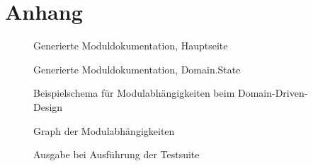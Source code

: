 \section{Anhang} \label{Anhang}

\begin{figure}[ht]
    \caption{Generierte Moduldokumentation, Hauptseite}
    \label{module-doc-index}
\end{figure}

\begin{figure}[ht]
    \caption{Generierte Moduldokumentation, Domain.State}
    \label{module-doc-state}
\end{figure}

\begin{figure}[ht]
    \caption{Beispielschema für Modulabhängigkeiten beim Domain-Driven-Design \cite{domain-driven-design}}
    \label{domain-driven-design-layers}
    \centering{}
\end{figure}

\begin{figure}[ht]
    \caption{Graph der Modulabhängigkeiten}
    \label{module-dependency-graph}
    \centering{}
\end{figure}

\begin{figure}[ht]
    \caption{Ausgabe bei Ausführung der Testsuite}
    \label{test-suite}
    \centering{}
\end{figure}